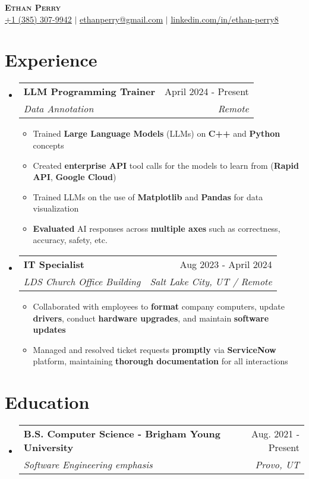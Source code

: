 \documentclass[letterpaper,11pt]{article}
\makeatletter
\newcommand{\resumeItem}[1]{
  \item\small{
    {#1}
  }
}
\newcommand{\resumeSubheading}[4]{
  \vspace{-2pt}\item
    \begin{tabular*}{0.97\textwidth}[t]{l@{\extracolsep{\fill}}r}
      \textbf{#1} & #2 \\
      \textit{\small#3} & \textit{\small #4} \\
    \end{tabular*}\vspace{-5pt}
}
\newcommand{\resumeSubHeadingListStart}{\begin{itemize}[leftmargin=0.15in, label={}]}
\newcommand{\resumeSubHeadingListEnd}{\end{itemize}}
\newcommand{\resumeItemListStart}{\begin{itemize}[itemsep=0pt,topsep=0pt,leftmargin=*]}
\newcommand{\resumeItemListEnd}{\end{itemize}}
\newcommand{\abd}[1]{\textcolor{accentColor}{\textbf{#1}}}
\makeatother
\begin{document}
\begin{center}
  {\textcolor{accentColor}{\selectfont\scshape\bfseries\Huge Ethan Perry}} \\ \vspace{3pt}
  \small\href{tel:13853079942}{\underline{+1 (385) 307-9942}} $|$ \href{mailto:ethanperry32@gmail.com}{\underline{ethanperry@gmail.com}} $|$
  \href{https://www.linkedin.com/in/ethanperry8/}{\underline{linkedin.com/in/ethan-perry8}}  %
\end{center}



\section{\textcolor{accentColor}{Experience}}
\resumeSubHeadingListStart

\resumeSubheading
{LLM Programming Trainer}{April 2024 \textcolor{accentColor}{-} Present}
{Data Annotation}{Remote}
\resumeItemListStart
    \resumeItem{Trained \abd{Large Language Models} (LLMs) on \abd{C++} and \abd{Python} concepts}
    \resumeItem{Created \abd{enterprise API} tool calls for the models to learn from (\abd{Rapid API}, \abd{Google Cloud})}
    \resumeItem{Trained LLMs on the use of \abd{Matplotlib} and \abd{Pandas} for data visualization}
    \resumeItem{\abd{Evaluated} AI responses across \abd{multiple axes} such as correctness, accuracy, safety, etc.}
\resumeItemListEnd

\resumeSubheading
{IT Specialist}{Aug 2023 \textcolor{accentColor}{-} April 2024}
{LDS Church Office Building}{Salt Lake City, UT / Remote}
\resumeItemListStart
    \resumeItem{Collaborated with employees to \abd{format} company computers, update \abd{drivers}, conduct \abd{hardware upgrades}, and maintain \abd{software updates}}
    \resumeItem{Managed and resolved ticket requests \abd{promptly} via \abd{ServiceNow} platform, maintaining \abd{thorough documentation} for all interactions}
\resumeItemListEnd

\resumeSubHeadingListEnd

\section{\textcolor{accentColor}{Education}}
\resumeSubHeadingListStart
    \resumeSubheading
    {B.S. Computer Science - Brigham Young University}{Aug. 2021 \textcolor{accentColor}{-} Present}
    {Software Engineering emphasis}{Provo, UT}
\resumeItemListEnd
    
\end{document}

